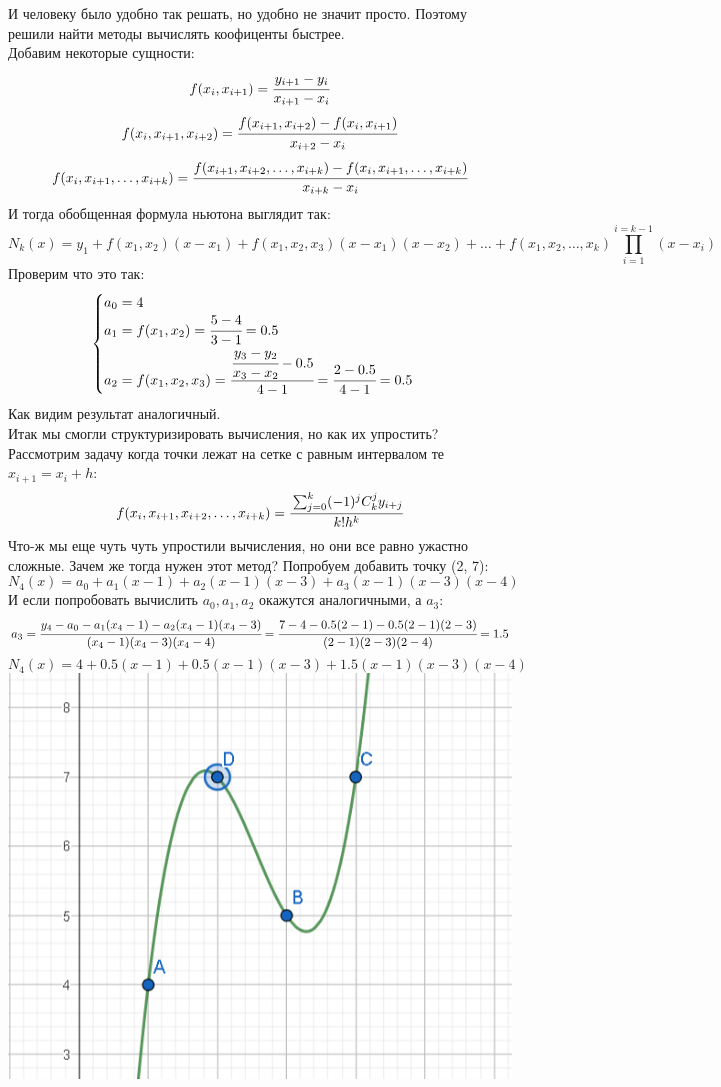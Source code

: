 \documentclass[12pt]{article} %
\begin{document}
		И человеку было удобно так решать, но удобно не значит просто. Поэтому решили найти методы вычислять коофиценты быстрее.\\
		Добавим некоторые сущности:
		\[f(x_i, x_{i+1}) = \cfrac{y_{i+1} - y_i}{x_{i+1} - x_i} \]
		\[f(x_i, x_{i+1}, x_{i+2}) = \cfrac{f(x_{i+1}, x_{i+2}) - f(x_i, x_{i+1})}{x_{i+2} - x_i} \]
		\[f(x_i, x_{i+1},\dots , x_{i+k}) = \cfrac{f(x_{i+1}, x_{i+2}, \dots,  x_{i+k}) - f(x_i, x_{i+1}, \dots, x_{i+k})}{x_{i+k} - x_i} \]
		И тогда обобщенная формула ньютона выглядит так:
		\[N_k(x) = y_1 + f(x_1, x_{2})(x-x_1) + f(x_1, x_2, x_3)(x-x_1)(x-x_2) + \dots + f(x_1, x_{2},\dots , x_{k}) \prod_{i=1}^{i=k-1}(x - x_i)\]
		Проверим что это так:
		\[ \begin{cases}
			a_0 = 4\\
			a_1 = f(x_1, x_2) = \cfrac{5 - 4}{3 - 1} = 0.5\\
			a_2 = f(x_1, x_2, x_3) = \cfrac{ \cfrac{y_3 - y_2}{x_3 - x_2} - 0.5}{4-1} =  \cfrac{ 2 - 0.5}{4-1} = 0.5 \\
		\end{cases}\]
		Как видим результат аналогичный.\\
		Итак мы смогли структуризировать вычисления, но как их упростить? Рассмотрим задачу когда точки лежат на сетке с равным интервалом те $x_{i + 1} = x_i + h$:
		\[f(x_i, x_{i + 1}, x_{i + 2}, \dots , x_{i + k}) = \cfrac{\sum_{j=0}^{k} (-1) ^ j C_k^j y_{i+j}}{k!h^k}\]
		Что-ж мы еще чуть чуть упростили вычисления, но они все равно ужастно сложные. Зачем же тогда нужен этот метод? Попробуем добавить точку (2, 7):
		 \[N_4(x) = a_0 + a_1(x-1) + a_2(x-1)(x-3) + a_3(x-1)(x-3)(x-4)\]
		 И если попробовать вычислить $a_0, a_1, a_2$ окажутся аналогичными, а $a_3$: \[ a_3 =  \cfrac{y_4 - a_0 - a_1(x_4-1) - a_2(x_4-1)(x_4-3)}{(x_4-1)(x_4-3)(x_4-4)} = \cfrac{7 - 4 - 0.5(2-1) - 0.5(2-1)(2-3)}{(2-1)(2-3)(2-4)} = 1.5 \]
		 \[N_4(x) = 4 + 0.5(x-1) + 0.5(x-1)(x-3) + 1.5(x-1)(x-3)(x-4)\]
		 \includegraphics{4}
\end{document}
